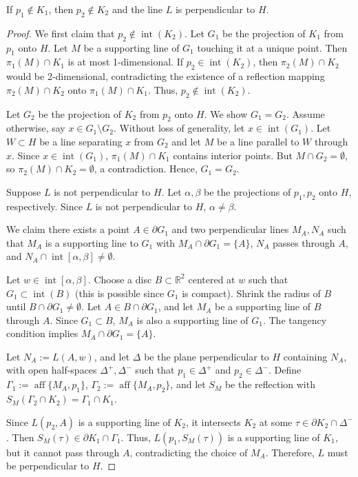 \documentclass[10pt,a4paper]{amsart}
\begin{document}
	\begin{lemma}\label{orto}
		If $p_1 \notin K_1$, then $p_2 \notin K_2$ and the line $L$ is perpendicular to $H$.
	\end{lemma}

	\begin{proof}
		We first claim that $p_2 \notin \operatorname{int}(K_2)$. Let $G_1$ be the projection of $K_1$ from $p_1$ onto $H$. Let $M$ be a supporting line of $G_1$ touching it at a unique point. Then $\pi_1(M) \cap K_1$ is at most 1-dimensional. If $p_2 \in \operatorname{int}(K_2)$, then $\pi_2(M) \cap K_2$ would be 2-dimensional, contradicting the existence of a reflection mapping $\pi_2(M) \cap K_2$ onto $\pi_1(M) \cap K_1$. Thus, $p_2 \notin \operatorname{int}(K_2)$.
		
		Let $G_2$ be the projection of $K_2$ from $p_2$ onto $H$. We show $G_1 = G_2$. Assume otherwise, say $x \in G_1 \setminus G_2$. Without loss of generality, let $x \in \operatorname{int}(G_1)$. Let $W \subset H$ be a line separating $x$ from $G_2$ and let $M$ be a line parallel to $W$ through $x$. Since $x \in \operatorname{int}(G_1)$, $\pi_1(M) \cap K_1$ contains interior points. But $M \cap G_2 = \emptyset$, so $\pi_2(M) \cap K_2 = \emptyset$, a contradiction. Hence, $G_1 = G_2$.
		
		Suppose $L$ is not perpendicular to $H$. Let $\alpha, \beta$ be the projections of $p_1, p_2$ onto $H$, respectively. Since $L$ is not perpendicular to $H$, $\alpha \neq \beta$.
		
		We claim there exists a point $A \in \partial G_1$ and two perpendicular lines $M_A, N_A$ such that $M_A$ is a supporting line to $G_1$ with $M_A \cap \partial G_1 = \{A\}$, $N_A$ passes through $A$, and $N_A \cap \operatorname{int}[\alpha, \beta] \neq \emptyset$.
		
		Let $w \in \operatorname{int}[\alpha, \beta]$. Choose a disc $B \subset \mathbb{R}^2$ centered at $w$ such that $G_1 \subset \operatorname{int}(B)$ (this is possible since $G_1$ is compact). Shrink the radius of $B$ until $B \cap \partial G_1 \neq \emptyset$. Let $A \in B \cap \partial G_1$, and let $M_A$ be a supporting line of $B$ through $A$. Since $G_1 \subset B$, $M_A$ is also a supporting line of $G_1$. The tangency condition implies $M_A \cap \partial G_1 = \{A\}$.
		
		Let $N_A := L(A, w)$, and let $\Delta$ be the plane perpendicular to $H$ containing $N_A$, with open half-spaces $\Delta^+, \Delta^-$ such that $p_1 \in \Delta^+$ and $p_2 \in \Delta^-$. Define $\Gamma_1 := \operatorname{aff}\{M_A, p_1\}$, $\Gamma_2 := \operatorname{aff}\{M_A, p_2\}$, and let $S_M$ be the reflection with $S_M(\Gamma_2 \cap K_2) = \Gamma_1 \cap K_1$.
		
		Since $L(p_2, A)$ is a supporting line of $K_2$, it intersects $K_2$ at some $\tau \in \partial K_2 \cap \Delta^-$. Then $S_M(\tau) \in \partial K_1 \cap \Gamma_1$. Thus, $L(p_1, S_M(\tau))$ is a supporting line of $K_1$, but it cannot pass through $A$, contradicting the choice of $M_A$. Therefore, $L$ must be perpendicular to $H$.
	\end{proof}
\end{document}
